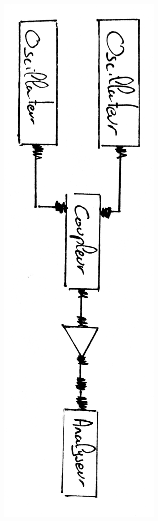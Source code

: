 \documentclass[a4paper,12pt]{report}            %
\begin{document}
\begin{center}\includegraphics[scale = 0.2, angle =90]{pic/IP3_montage.png}\\ \end{center}
\end{document}
